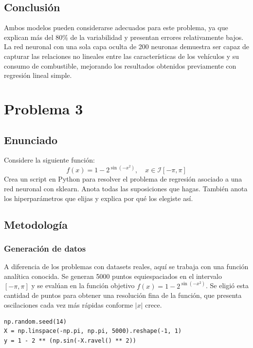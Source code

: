 \documentclass{article}
\begin{document}
\subsection{Conclusión}

Ambos modelos pueden considerarse adecuados para este problema, ya que explican más del 80\% de la variabilidad y presentan errores relativamente bajos. La red neuronal con una sola capa oculta de 200 neuronas demuestra ser capaz de capturar las relaciones no lineales entre las características de los vehículos y su consumo de combustible, mejorando los resultados obtenidos previamente con regresión lineal simple.

\section{Problema 3}

\subsection{Enunciado}  

Considere la siguiente función:
\[
    f(x) = 1-2^{\sin(-x^2)}, \quad x \in \mathcal{I}[-\pi, \pi]
\]
Crea un script en Python para resolver el problema de regresión asociado a una red neuronal con sklearn. Anota todas las suposiciones que hagas. También anota los hiperparámetros que elijas y explica por qué los elegiste así.

\subsection{Metodología}

\subsubsection{Generación de datos}

A diferencia de los problemas con datasets reales, aquí se trabaja con una función analítica conocida. Se generan 5000 puntos equiespaciados en el intervalo $[-\pi, \pi]$ y se evalúan en la función objetivo $f(x) = 1 - 2^{\sin(-x^2)}$. Se eligió esta cantidad de puntos para obtener una resolución fina de la función, que presenta oscilaciones cada vez más rápidas conforme $|x|$ crece.

\begin{lstlisting}
np.random.seed(14)
X = np.linspace(-np.pi, np.pi, 5000).reshape(-1, 1)
y = 1 - 2 ** (np.sin(-X.ravel() ** 2))
\end{lstlisting}
\end{document}
